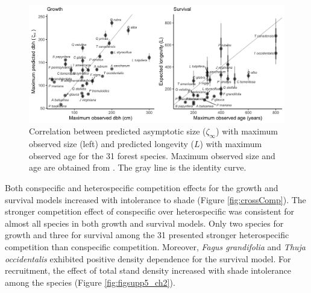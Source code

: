 \hypertarget{fig:crossGrowthSurv}{%
\begin{figure}
\centering
\includegraphics[width=1\textwidth,height=\textheight]{manuscript/figs/crossGrowthSurv.png}
\caption[{Correlation between predicted asymptotic size
(\(\zeta_{\infty}\)) with maximum observed size (left) and predicted
longevity (\(L\)) with maximum observed age for the 31 forest
species.}]{Correlation between predicted asymptotic size
(\(\zeta_{\infty}\)) with maximum observed size (left) and predicted
longevity (\(L\)) with maximum observed age for the 31 forest species.
Maximum observed size and age are obtained from
\citet{burns1990silvics}. The gray line is the identity curve.}
\label{fig:crossGrowthSurv}
\end{figure}
}

Both conspecific and heterospecific competition effects for the growth
and survival models increased with intolerance to shade (Figure
\ref{fig:crossComp}). The stronger competition effect of conspecific
over heterospecific was consistent for almost all species in both growth
and survival models. Only two species for growth and three for survival
among the 31 presented stronger heterospecific competition than
conspecific competition. Moreover, \emph{Fagus grandifolia} and
\emph{Thuja occidentalis} exhibited positive density dependence for the
survival model. For recruitment, the effect of total stand density
increased with shade intolerance among the species (Figure \ref{fig:figsupp5_ch2}).\\


